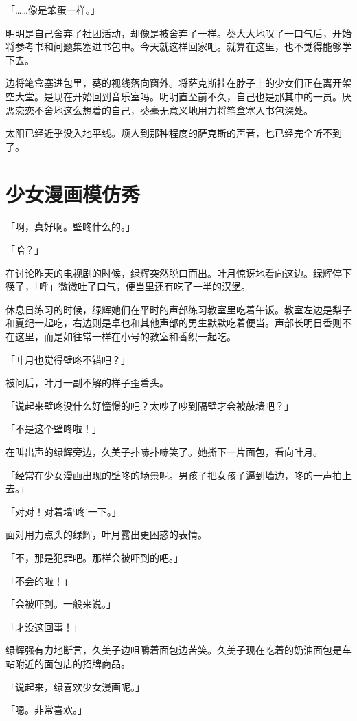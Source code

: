 \documentclass[UTF8]{ctexart}
\begin{document}
    「……像是笨蛋一样。」

    明明是自己舍弃了社团活动，却像是被舍弃了一样。葵大大地叹了一口气后，开始将参考书和问题集塞进书包中。今天就这样回家吧。就算在这里，也不觉得能够学下去。

    边将笔盒塞进包里，葵的视线落向窗外。将萨克斯挂在脖子上的少女们正在离开架空大堂。是现在开始回到音乐室吗。明明直至前不久，自己也是那其中的一员。厌恶恋恋不舍地这么想着的自己，葵毫无意义地用力将笔盒塞入书包深处。

    太阳已经近乎没入地平线。烦人到那种程度的萨克斯的声音，也已经完全听不到了。
    \section{少女漫画模仿秀}
    「啊，真好啊。壁咚什么的。」

    「哈？」

    在讨论昨天的电视剧的时候，绿辉突然脱口而出。叶月惊讶地看向这边。绿辉停下筷子，「呼」微微吐了口气，便当里还有吃了一半的汉堡。

    休息日练习的时候，绿辉她们在平时的声部练习教室里吃着午饭。教室左边是梨子和夏纪一起吃，右边则是卓也和其他声部的男生默默吃着便当。声部长明日香则不在这里，而是如往常一样在小号的教室和香织一起吃。

    「叶月也觉得壁咚不错吧？」

    被问后，叶月一副不解的样子歪着头。

    「说起来壁咚没什么好憧憬的吧？太吵了吵到隔壁才会被敲墙吧？」

    「不是这个壁咚啦！」

    在叫出声的绿辉旁边，久美子扑哧扑哧笑了。她撕下一片面包，看向叶月。

    「经常在少女漫画出现的壁咚的场景呢。男孩子把女孩子逼到墙边，咚的一声拍上去。」

    「对对！对着墙‘咚’一下。」

    面对用力点头的绿辉，叶月露出更困惑的表情。

    「不，那是犯罪吧。那样会被吓到的吧。」

    「不会的啦！」

    「会被吓到。一般来说。」

    「才没这回事！」

    绿辉强有力地断言，久美子边咀嚼着面包边苦笑。久美子现在吃着的奶油面包是车站附近的面包店的招牌商品。

    「说起来，绿喜欢少女漫画呢。」

    「嗯。非常喜欢。」
\end{document}
